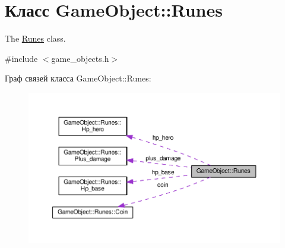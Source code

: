 \hypertarget{classGameObject_1_1Runes}{}\section{Класс Game\+Object\+:\+:Runes}
\label{classGameObject_1_1Runes}


The \hyperlink{classGameObject_1_1Runes}{Runes} class.  




{\ttfamily \#include $<$game\+\_\+objects.\+h$>$}



Граф связей класса Game\+Object\+:\+:Runes\+:\nopagebreak
\begin{figure}[H]
\begin{center}
\leavevmode
\includegraphics[width=350pt]{classGameObject_1_1Runes__coll__graph}
\end{center}
\end{figure}
